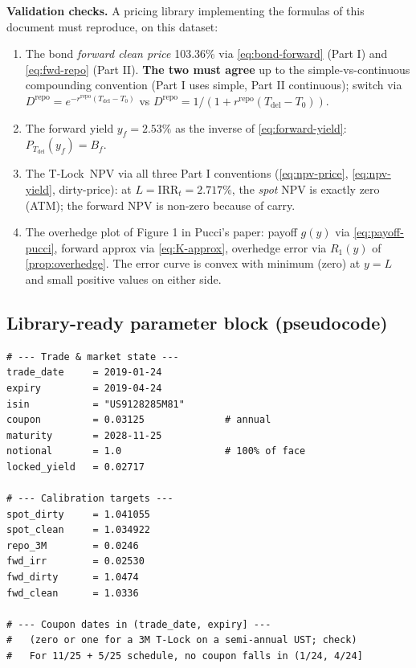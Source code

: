 \documentclass[11pt]{article}
\theoremstyle{definition}
\newcommand{\Tlock}{T-Lock}
\newcommand{\IRR}{\ensuremath{\mathrm{IRR}}}
\newcommand{\Drepo}{D^{\mathrm{repo}}}
\newcommand{\Tdel}{T_{\mathrm{del}}}
\newcommand{\Bf}{B_f}
\newcommand{\rrepo}{r^{\mathrm{repo}}}
\begin{document}
\textbf{Validation checks.} A pricing library implementing the formulas
of this document must reproduce, on this dataset:
\begin{enumerate}[leftmargin=1.6em,itemsep=2pt]
\item The bond \emph{forward clean price} 103.36\% via
      \cref{eq:bond-forward} (Part I) and \cref{eq:fwd-repo} (Part II).
      \textbf{The two must agree} up to the simple-vs-continuous
      compounding convention (Part I uses simple, Part II continuous);
      switch via $\Drepo = e^{-\rrepo(\Tdel-T_0)}$ vs
      $\Drepo = 1/(1+\rrepo(\Tdel-T_0))$.
\item The forward yield $y_f = 2.53\%$ as the inverse of
      \cref{eq:forward-yield}: $P_{\Tdel}(y_f) = \Bf$.
\item The \Tlock\ NPV via all three Part I conventions (\cref{eq:npv-price},
      \cref{eq:npv-yield}, dirty-price): at $L = \IRR_t = 2.717\%$, the
      \emph{spot} NPV is exactly zero (ATM); the forward NPV is non-zero
      because of carry.
\item The overhedge plot of Figure 1 in Pucci's paper:
      payoff $g(y)$ via \cref{eq:payoff-pucci},
      forward approx via \cref{eq:K-approx},
      overhedge error via $R_1(y)$ of \cref{prop:overhedge}. The error
      curve is convex with minimum (zero) at $y=L$ and small positive
      values on either side.
\end{enumerate}

\subsection{Library-ready parameter block (pseudocode)}

\begin{verbatim}
# --- Trade & market state ---
trade_date     = 2019-01-24
expiry         = 2019-04-24
isin           = "US9128285M81"
coupon         = 0.03125              # annual
maturity       = 2028-11-25
notional       = 1.0                  # 100% of face
locked_yield   = 0.02717

# --- Calibration targets ---
spot_dirty     = 1.041055
spot_clean     = 1.034922
repo_3M        = 0.0246
fwd_irr        = 0.02530
fwd_dirty      = 1.0474
fwd_clean      = 1.0336

# --- Coupon dates in (trade_date, expiry] ---
#   (zero or one for a 3M T-Lock on a semi-annual UST; check)
#   For 11/25 + 5/25 schedule, no coupon falls in (1/24, 4/24]
\end{verbatim}
\end{document}
